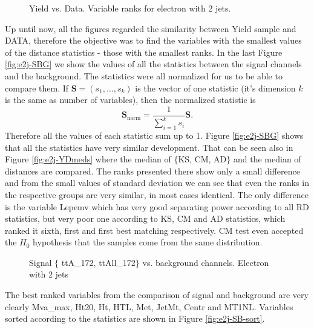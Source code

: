 \begin{figure}[h!]
    \quad
    \caption{Yield vs. Data. Variable ranks for electron with 2 jets.}
    \label{fig:e2j-RD}
\end{figure}

Up until now, all the figures regarded the similarity between Yield sample and DATA, therefore the objective was to find the variables with the smallest values of the distance statistics - those with the smallest ranks. In the last Figure \ref{fig:e2j-SBG} we show the values of all the statistics between the signal channels and the background. The statistics were all normalized for us to be able to compare them. If $\mathbf{S} = (s_1,\ldots,s_k)$ is the vector of one statistic (it's dimension $k$ is the same as number of variables), then the normalized statistic is 
\begin{equation*}
\mathbf{S}_\mathrm{norm} = \dfrac{1}{\sum_{i=1}^k s_i} \mathbf{S}.
\end{equation*}
Therefore all the values of each statistic sum up to 1. Figure \ref{fig:e2j-SBG} shows that all the statistics have very similar development. That can be seen also in Figure \ref{fig:e2j-YDmeds} where the median of $\lbrace$KS, CM, AD$\rbrace$ and the median of \ren distances are compared. The ranks presented there show only a small difference and from the small values of standard deviation we can see that even the ranks in the respective groups are very similar, in most cases identical. The only difference is the variable \textsf{Lepemv} which has very good separating power according to all RD statistics, but very poor one according to KS, CM and AD statistics, which ranked it sixth, first and first best matching respectively. CM test even accepted the $H_0$ hypothesis that the samples come from the same distribution.  
\begin{figure}[h]
\quad
    \caption{Signal $\lbrace$ \textsf{ttA\_172},  \textsf{ttAll\_172}$\rbrace$ vs. background channels. Electron with 2 jets}
    \label{fig:e2j-SBGmed}
\end{figure}
The best ranked variables from the comparison of signal and background are very clearly \textsf{Mva\_max, Ht20, Ht, HTL, Met, JetMt, Centr  } and \textsf{MT1NL}. Variables sorted according to the statistics are shown in Figure \ref{fig:e2j-SB-sort}.

